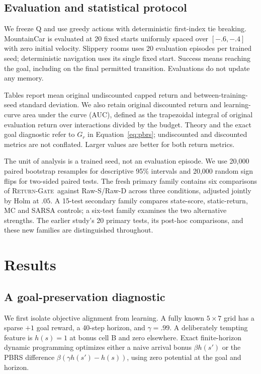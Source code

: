 \documentclass[10pt,twocolumn,letterpaper]{article}
\newcommand{\gate}{\textsc{Return-Gate}}
\begin{document}
\subsection{Evaluation and statistical protocol}
We freeze Q and use greedy actions with deterministic first-index tie breaking. MountainCar is evaluated at 20 fixed starts uniformly spaced over $[-.6,-.4]$ with zero initial velocity. Slippery rooms uses 20 evaluation episodes per trained seed; deterministic navigation uses its single fixed start. Success means reaching the goal, including on the final permitted transition. Evaluations do not update any memory.

Tables report mean original undiscounted capped return and between-training-seed standard deviation. We also retain original discounted return and learning-curve area under the curve (AUC), defined as the trapezoidal integral of original evaluation return over interactions divided by the budget. Theory and the exact goal diagnostic refer to $G_r$ in Equation~\ref{eq:pbrs}; undiscounted and discounted metrics are not conflated. Larger values are better for both return metrics.

The unit of analysis is a trained seed, not an evaluation episode. We use 20,000 paired bootstrap resamples for descriptive 95\% intervals and 20,000 random sign flips for two-sided paired tests. The fresh primary family contains six comparisons of \gate\ against Raw-S/Raw-D across three conditions, adjusted jointly by Holm at $.05$. A 15-test secondary family compares state-score, static-return, MC and SARSA controls; a six-test family examines the two alternative strengths. The earlier study's 20 primary tests, its post-hoc comparisons, and these new families are distinguished throughout.

\section{Results}
\subsection{A goal-preservation diagnostic}
We first isolate objective alignment from learning. A fully known $5\times7$ grid has a sparse $+1$ goal reward, a 40-step horizon, and $\gamma=.99$. A deliberately tempting feature is $h(s)=1$ at bonus cell B and zero elsewhere. Exact finite-horizon dynamic programming optimizes either a naive arrival bonus $\beta h(s')$ or the PBRS difference $\beta(\gamma h(s')-h(s))$, using zero potential at the goal and horizon.
\end{document}

